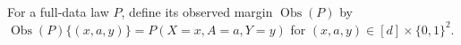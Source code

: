 For a full-data law \(P\), define its observed margin \(\operatorname{Obs}(P)\) by \(\operatorname{Obs}(P)\{(x,a,y)\}=P(X=x,A=a,Y=y)\) for \((x,a,y)\in[d]\times\{0,1\}^2\).